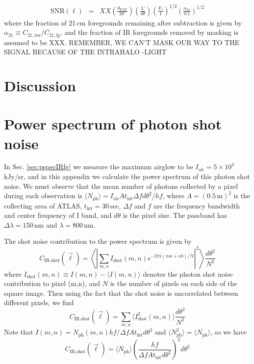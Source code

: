 \documentclass{emulateapj}
\newcommand{\IR}{\text{IR}}
\newcommand{\fg}{\text{fg}}
\newcommand{\res}{\text{res}}
\newcommand{\shot}{\text{shot}}
\newcommand{\SNR}{\text{SNR}}
\begin{document}
\begin{eqnarray}
	\SNR(\ell)&=&XX \left(\frac{\theta_\text{FOV}}{20^\circ}\right)\left(\frac{5'}{d\theta}\right)\left(\frac{F_\ell}{1}\right)^{1/2}\left(\frac{\alpha_{21}}{0.1}\right)^{1/2}
\end{eqnarray}
where the fraction of 21\,cm foregrounds remaining after subtraction is given by $\alpha_{21}\equiv C_{21,\res}/C_{21,\fg}$, and the fraction of IR foregrounds removed by masking is assumed to be XXX. REMEMBER, WE CAN'T MASK OUR WAY TO THE SIGNAL BECAUSE OF THE INTRAHALO
-LIGHT






\section{Discussion}

\appendix

\section{Power spectrum of photon shot noise}
\label{sec:Pshot}

In Sec. \ref{sec:pspecIRfg} we measure the maximum airglow to be $I_\text{air}=5\times10^3$ kJy/sr, and in this appendix we calculate the power spectrum of this photon shot noise. We must observe that the mean number of photons collected by a pixel during each observation is $\langle N_\text{ph}\rangle=I_\text{air}At_\text{int} \Delta f d\theta^2/hf$, where $A=(0.5\,\text{m})^2$ is the collecting area of ATLAS, $t_\text{int}=30\,$sec, $\Delta f$ and $f$ are the frequency bandwidth and center frequency of I band, and $d\theta$ is the pixel size. The passband has $\Delta\lambda=150\,$nm and $\lambda=800\,$nm. 

The shot noise contribution to the power spectrum is given by
\begin{equation}
C_{\IR, \shot}(\vec{\ell}) = \left\langle\left|\sum_{m,n}I_\shot(m,n)e^{-2\pi i(ma+nb)/N}\right|^2\right\rangle \frac{d\theta^2}{N^2}
\end{equation}
where $I_\shot(m,n)\equiv I(m,n)-\langle I(m,n)\rangle$ denotes the photon shot noise contribution to pixel (m,n), and $N$ is the number of pixels on each side of the square image. Then using the fact that the shot noise is uncorrelated between different pixels, we find
\begin{equation}
C_{\IR, \shot}(\vec{\ell}) = \sum_{m,n}\langle I^2_\shot(m,n)\rangle \frac{d\theta^2}{N^2}
\end{equation}
Note that $I(m,n)=N_\text{ph}(m,n)hf/\Delta f A t_\text{int}d\theta^2$ and $\langle N_\text{ph}^2\rangle = \langle N_\text{ph}\rangle$, so we have
\begin{equation}
C_{\IR, \shot}(\vec{\ell}) = \langle N_\text{ph}\rangle \left(\frac{hf}{\Delta f A t_\text{int}d\theta^2}\right)^2 d\theta^2
\end{equation}
\end{document}
